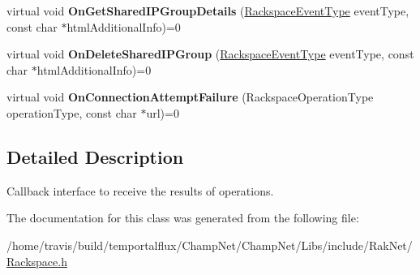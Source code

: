 \begin{DoxyCompactItemize}
\item 
\hypertarget{class_rak_net_1_1_rackspace2_event_callback_a830054943c6492fd8cc461d4c5934b43}{virtual void {\bfseries On\-Get\-Shared\-I\-P\-Group\-Details} (\hyperlink{namespace_rak_net_a120cf6e1a0904cff45269f14c3c4c289}{Rackspace\-Event\-Type} event\-Type, const char $\ast$html\-Additional\-Info)=0}\label{class_rak_net_1_1_rackspace2_event_callback_a830054943c6492fd8cc461d4c5934b43}

\item 
\hypertarget{class_rak_net_1_1_rackspace2_event_callback_a6c22535b42d995505236d853e41fc202}{virtual void {\bfseries On\-Delete\-Shared\-I\-P\-Group} (\hyperlink{namespace_rak_net_a120cf6e1a0904cff45269f14c3c4c289}{Rackspace\-Event\-Type} event\-Type, const char $\ast$html\-Additional\-Info)=0}\label{class_rak_net_1_1_rackspace2_event_callback_a6c22535b42d995505236d853e41fc202}

\item 
\hypertarget{class_rak_net_1_1_rackspace2_event_callback_a434eae0690190ed32126a3af261df317}{virtual void {\bfseries On\-Connection\-Attempt\-Failure} (Rackspace\-Operation\-Type operation\-Type, const char $\ast$url)=0}\label{class_rak_net_1_1_rackspace2_event_callback_a434eae0690190ed32126a3af261df317}

\end{DoxyCompactItemize}


\subsection{Detailed Description}
Callback interface to receive the results of operations. 

The documentation for this class was generated from the following file\-:\begin{DoxyCompactItemize}
\item 
/home/travis/build/temportalflux/\-Champ\-Net/\-Champ\-Net/\-Libs/include/\-Rak\-Net/\hyperlink{_rackspace_8h}{Rackspace.\-h}\end{DoxyCompactItemize}
